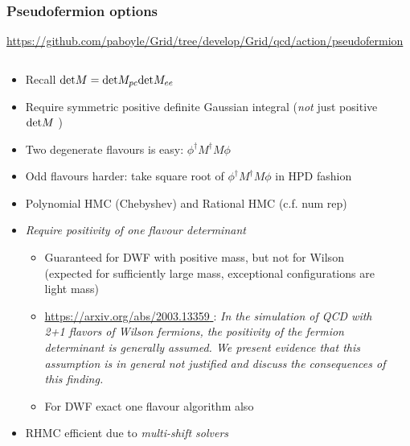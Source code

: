 \documentclass[pdf,ps,8pt]{beamer}
\newcommand{\link}[1]{\href{#1}{ {\color{blue} #1} }}
\begin{document}
  
\begin{frame}[fragile]\small\frametitle{ Pseudofermion options }

\link{https://github.com/paboyle/Grid/tree/develop/Grid/qcd/action/pseudofermion}

\begin{columns}
\begin{column}{0.75\textwidth}
\begin{itemize}
\item Recall ${\rm det} M = {\rm det} M_{pc} {\rm det} M_{ee}$
\item Require symmetric positive definite Gaussian integral (\emph{not} just positive ${\rm det} M$ )
\item Two degenerate flavours is easy: $\phi^\dagger M^\dagger M \phi$
\item Odd flavours harder: take square root of $\phi^\dagger M^\dagger M \phi$ in HPD fashion
\item Polynomial HMC (Chebyshev) and Rational HMC (c.f. num rep)
\item \emph{Require positivity of one flavour determinant} 
\begin{itemize}
\item Guaranteed for DWF with positive mass, but not for Wilson (expected for sufficiently large mass, exceptional configurations are light mass)
\item \link{https://arxiv.org/abs/2003.13359}: \emph{In the simulation of QCD with 2+1 flavors of Wilson fermions, the positivity of the fermion determinant is generally assumed. We present evidence that this assumption is in general not justified and discuss the consequences of this finding.}
\item For DWF exact one flavour algorithm also
\end{itemize}
\item RHMC efficient due to \emph{multi-shift solvers}
\end{itemize}
\end{column}
\begin{column}{0.25\textwidth}

\end{column}
\end{columns}
\end{frame}
\end{document}
